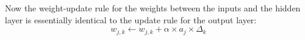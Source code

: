 \documentclass{mcmthesis}
\begin{document}
	Now the weight-update rule for the weights between the inputs and the hidden layer is essentially identical to the update rule for the output layer:
	\begin{equation}
	    w_{j,k}\leftarrow w_{j,k}+\alpha \times a_{j} \times\Delta _{k}
	\end{equation}
	



\end{document}
